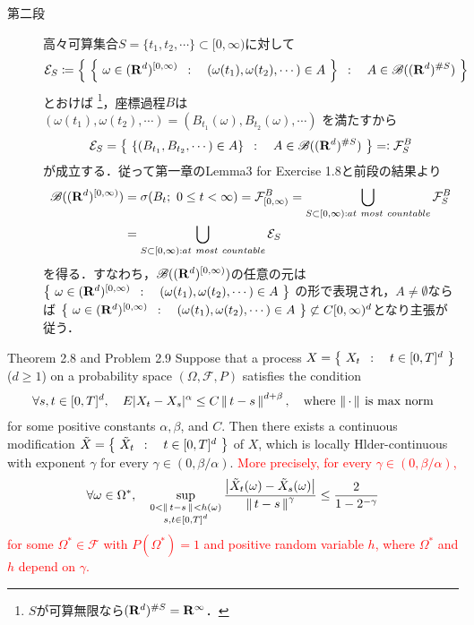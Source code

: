 \begin{prf}
\begin{description}
			\item[第二段]
				高々可算集合$S = \{t_1,t_2,\cdots\} \subset [0,\infty)$に対して
				\begin{align}
					\mathcal{E}_S \coloneqq \left\{\ \left\{\ \omega \in (\mathbf{R}^d)^{[0,\infty)}\ \, : \quad (\omega(t_1),\omega(t_2),\cdots) \in A\ \right\}\ \, : \quad A \in \mathscr{B}((\mathbf{R}^d)^{\# S})\ \right\}
				\end{align}
				とおけば
				\footnote{
					$S$が可算無限なら$(\mathbf{R}^d)^{\# S} = \mathbf{R}^\infty$．
				}，座標過程$B$は
				$(\omega(t_1),\omega(t_2),\cdots) = (B_{t_1}(\omega),B_{t_2}(\omega),\cdots)$
				を満たすから
				\begin{align}
					\mathcal{E}_S = \left\{\ \left\{(B_{t_1},B_{t_2},\cdots) \in A\right\}\ \, : \quad A \in \mathscr{B}((\mathbf{R}^d)^{\# S})\ \right\} =\mathrel{\mathop:} \mathcal{F}^B_S
				\end{align}
				が成立する．従って第一章のLemma3 for Exercise 1.8と前段の結果より
				\begin{align}
					\borel{(\R^d)^{[0,\infty)}}
					&= \sigma(B_t;\ 0 \leq t < \infty)
					= \mathcal{F}^B_{[0,\infty)}
					= \bigcup_{S \subset [0,\infty):at\ most\ countable} \mathcal{F}^B_S\\
					&= \bigcup_{S \subset [0,\infty):at\ most\ countable} \mathcal{E}_S
				\end{align}
				を得る．すなわち，$\mathscr{B}((\mathbf{R}^d)^{[0,\infty)})$の任意の元は
				$\left\{\ \omega \in (\mathbf{R}^d)^{[0,\infty)}\ \, : \quad (\omega(t_1),\omega(t_2),\cdots) \in A\ \right\}$
				の形で表現され，$A \neq \emptyset$ならば
				$\left\{\ \omega \in (\mathbf{R}^d)^{[0,\infty)}\ \, : \quad (\omega(t_1),\omega(t_2),\cdots) \in A\ \right\} \not\subset C[0,\infty)^d$となり主張が従う．
				\QED
		\end{description}
	\end{prf}
	
	\begin{itembox}[l]{Theorem 2.8 and Problem 2.9}
		Suppose that a process $X = \left\{\ X_t\ \, : \quad t \in  [0,T]^d\ \right\}$ ($d \geq 1$)
		on a probability space $(\Omega,\mathscr{F},P)$ satisfies the condition
		\begin{align}
			\forall s,t \in [0,T]^d,\quad
			E|X_t - X_s|^\alpha \leq C\left\|\, t-s\, \right\|_{}^{d + \beta},
			\quad \mbox{where $\left\|\, \cdot\, \right\|_{}$ is max norm}
		\end{align}
		for some positive constants $\alpha,\beta$, and $C$. Then there exists a 
		continuous modification $\tilde{X} = \left\{\ \tilde{X}_t\ \, : \quad t \in [0,T]^d\ \right\}$ of $X$, 
		which is locally Hlder-continuous with exponent $\gamma$ for every 
		$\gamma \in (0,\beta/\alpha)$. \textcolor{red}{More precisely, for every $\gamma \in (0,\beta/\alpha)$,
		\begin{align}
			\forall \omega \in \Omega^*, \quad \operatorname*{sup}_{\substack{0 < \left\|\, t-s\, \right\|_{} < h(\omega) \\ s,t \in [0,T]^d}} \frac{\left| \tilde{X}_t(\omega) - \tilde{X}_s(\omega) \right|}{\left\|\, t-s\, \right\|_{}^\gamma} \leq \frac{2}{1-2^{-\gamma}}
		\end{align}
		for some $\Omega^* \in \mathscr{F}$ with $P(\Omega^*)=1$ and 
		positive random variable $h$, where $\Omega^*$ and $h$ depend on $\gamma$.}
	\end{itembox}
	
